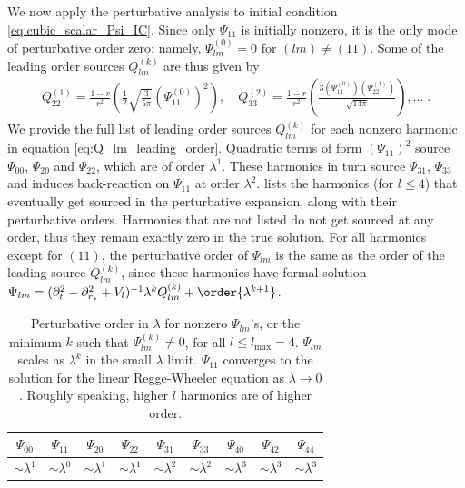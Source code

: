 We now apply the perturbative analysis to initial condition \eqref{eq:cubic_scalar_Psi_IC}.
Since only $\Psi_{11}$ is initially nonzero, it is the only mode of perturbative order zero; namely, $\Psi_{lm}^{(0)} = 0$ for $(lm) \neq (11)$.
Some of the leading order sources $Q_{lm}^{(k)}$ are thus given by
\begin{align}
  Q_{22}^{(1)} = \frac{1-r}{r^2} \left( \frac{1}{2} \sqrt{\frac{3}{5 \pi }} (\Psi^{(0)}_{11})^2 \right),\quad
  Q_{33}^{(2)} = \frac{1-r}{r^2} \left( \frac{3 (\Psi^{(0)}_{11}) (\Psi^{(1)}_{22})}{\sqrt{14 \pi }} \right),\hdots \;.
\end{align}
We provide the full list of leading order sources $Q_{lm}^{(k)}$ for each nonzero harmonic in equation \eqref{eq:Q_lm_leading_order}.
Quadratic terms of form $(\Psi_{11})^2$ source $\Psi_{00}$, $\Psi_{20}$ and $\Psi_{22}$, which are of order $\lambda^1$.
These harmonics in turn source $\Psi_{31}$, $\Psi_{33}$ and induces back-reaction on $\Psi_{11}$ at order $\lambda^2$.
 lists the harmonics (for $l \leq 4$) that eventually get sourced in the perturbative expansion, along with their perturbative orders.
Harmonics that are not listed do not get sourced at any order, thus they remain exactly zero in the true solution.
For all harmonics except for $(11)$, the perturbative order of $\Psi_{lm}$ is the same as the order of the leading source $Q_{lm}^{(k)}$, since these harmonics have formal solution $\Psi_{lm} = (\partial_t^2 -  \partial_{r_*}^2 + V_l)^{-1} \lambda^k Q_{lm}^{(k)} + \order{\lambda^{k+1}}$.
\begin{table}[h]
  \centering
  \begin{tabular}{|c|c|c|c|c|c|c|c|c|}
    \hline
    $\Psi_{00}$ & $\Psi_{11}$ & $\Psi_{20}$ & $\Psi_{22}$ & $\Psi_{31}$ & $\Psi_{33}$ & $\Psi_{40}$ & $\Psi_{42}$ & $\Psi_{44}$ \\
    \hline
    $\sim\lambda^1$ & $\sim\lambda^0$ & $\sim\lambda^1$ & $\sim\lambda^1$ & $\sim\lambda^2$ & $\sim\lambda^2$ & $\sim\lambda^3$ & $\sim\lambda^3$ & $\sim\lambda^3$ \\
    \hline
  \end{tabular}
  \caption{Perturbative order in $\lambda$ for nonzero $\Psi_{lm}$'s, or the minimum $k$ such that $\Psi_{lm}^{(k)} \neq 0$, for all $l \leq l_{\mathrm{max}} = 4$.
    $\Psi_{lm}$ scales as $\lambda^k$ in the small $\lambda$ limit.
    $\Psi_{11}$ converges to the solution for the linear Regge-Wheeler equation as $\lambda \to 0$.
    Roughly speaking, higher $l$ harmonics are of higher order.
  }
  \label{tab:Psi_perturbative_orders}
\end{table}




